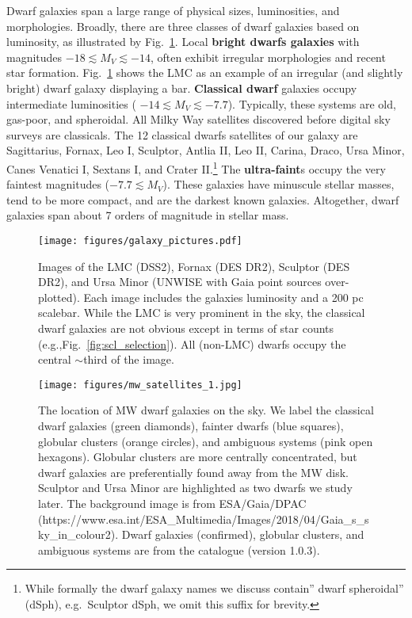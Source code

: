 Dwarf galaxies span a large range of physical sizes, luminosities, and
morphologies. Broadly, there are three classes of dwarf galaxies based
on luminosity, as illustrated by Fig.~\ref{fig:galaxy_images}. Local
\textbf{bright dwarfs galaxies} with magnitudes
\(-18 \lesssim M_V \lesssim  -14\), often exhibit irregular morphologies
and recent star formation. Fig.~\ref{fig:galaxy_images} shows the LMC as
an example of an irregular (and slightly bright) dwarf galaxy displaying
a bar. \textbf{Classical dwarf} galaxies occupy intermediate
luminosities ( \(-14 \lesssim M_V  \lesssim -7.7\)). Typically, these
systems are old, gas-poor, and spheroidal. All Milky Way satellites
discovered before digital sky surveys are classicals. The 12 classical
dwarfs satellites of our galaxy are Sagittarius, Fornax, Leo I,
Sculptor, Antlia II, Leo II, Carina, Draco, Ursa Minor, Canes Venatici
I, Sextans I, and Crater II.\footnote{While formally the dwarf galaxy
  names we discuss contain'' dwarf spheroidal'' (dSph), e.g.~Sculptor
  dSph, we omit this suffix for brevity.} The \textbf{ultra-faint}s
occupy the very faintest magnitudes (\(-7.7 \lesssim M_V\)). These
galaxies have minuscule stellar masses, tend to be more compact, and are
the darkest known galaxies. Altogether, dwarf galaxies span about 7
orders of magnitude in stellar mass.

\begin{figure}
\centering
\texttt{[image: figures/galaxy\_pictures.pdf]}
\caption[Dwarf Galaxy Pictures]{Images of the LMC (DSS2), Fornax (DES
DR2), Sculptor (DES DR2), and Ursa Minor (UNWISE with Gaia point sources
over-plotted). Each image includes the galaxies luminosity and a 200 pc
scalebar. While the LMC is very prominent in the sky, the classical
dwarf galaxies are not obvious except in terms of star counts
(e.g.,Fig.~\ref{fig:scl_selection}). All (non-LMC) dwarfs occupy the
central \(\sim\)third of the image.}\label{fig:galaxy_images}
\end{figure}

\begin{figure}
\centering
\texttt{[image: figures/mw\_satellites\_1.jpg]}
\caption[Dwarf galaxies sky position]{The location of MW dwarf galaxies
on the sky. We label the classical dwarf galaxies (green diamonds),
fainter dwarfs (blue squares), globular clusters (orange circles), and
ambiguous systems (pink open hexagons). Globular clusters are more
centrally concentrated, but dwarf galaxies are preferentially found away
from the MW disk. Sculptor and Ursa Minor are highlighted as two dwarfs
we study later. The background image is from ESA/Gaia/DPAC
(https://www.esa.int/ESA\_Multimedia/Images/2018/04/Gaia\_s\_sky\_in\_colour2).
Dwarf galaxies (confirmed), globular clusters, and ambiguous systems are
from the \citet{pace2024} catalogue (version
1.0.3).}\label{fig:mw_satellite_system}
\end{figure}

